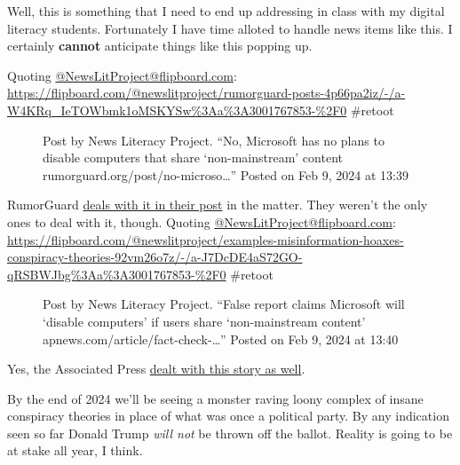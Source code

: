 Well, this is something that I need to end up addressing in class with
my digital literacy students. Fortunately I have time alloted to handle
news items like this. I certainly \textbf{cannot} anticipate things like
this popping up.

Quoting
\href{https://flipboard.com/@newslitproject/}{@NewsLitProject@flipboard.com}:
\url{https://flipboard.com/@newslitproject/rumorguard-posts-4p66pa2iz/-/a-W4KRq_IeTOWbmk1oMSKYSw\%3Aa\%3A3001767853-\%2F0}
\#retoot

\begin{figure}
\centering
{}
\caption{Post by News Literacy Project. ``No, Microsoft has no plans to
disable computers that share `non-mainstream' content
rumorguard.org/post/no-microso\ldots{}'' Posted on Feb 9, 2024 at 13:39}
\end{figure}

RumorGuard
\href{https://www.rumorguard.org/post/no-microsoft-didn-t-announce-it-would-disable-computers-of-users-who-share-non?utm_source=flipboard&utm_medium=activitypub}{deals
with it in their post} in the matter. They weren't the only ones to deal
with it, though. Quoting
\href{https://flipboard.com/@newslitproject/}{@NewsLitProject@flipboard.com}:
\url{https://flipboard.com/@newslitproject/examples-misinformation-hoaxes-conspiracy-theories-92vm26o7z/-/a-J7DcDE4aS72GO-qRSBWJbg\%3Aa\%3A3001767853-\%2F0}
\#retoot

\begin{figure}
\centering
{}
\caption{Post by News Literacy Project. ``False report claims Microsoft
will `disable computers' if users share `non-mainstream content'
apnews.com/article/fact-check-\ldots{}'' Posted on Feb 9, 2024 at 13:40}
\end{figure}

Yes, the Associated Press
\href{https://apnews.com/article/fact-check-microsoft-disable-computers-non-mainstream-264451828591?utm_source=flipboard&utm_medium=activitypub}{dealt
with this story as well}.

By the end of 2024 we'll be seeing a monster raving loony complex of
insane conspiracy theories in place of what was once a political party.
By any indication seen so far Donald Trump \emph{will not} be thrown off
the ballot. Reality is going to be at stake all year, I think.
